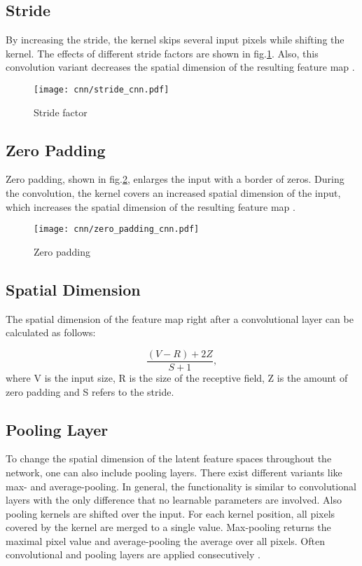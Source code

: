 \subsection{Stride}
By increasing the stride, the kernel skips several input pixels while shifting the kernel. The effects of different stride factors are shown in fig.\ref{fig:stride_cnn}. Also, this convolution variant decreases the spatial dimension of the resulting feature map \cite{OShea2015}.

\begin{figure}[H]
  \centering
  \texttt{[image: cnn/stride\_cnn.pdf]}
  \caption {Stride factor}
  \label{fig:stride_cnn}
\end{figure}


\subsection{Zero Padding}
Zero padding, shown in fig.\ref{fig:zero_padding_cnn}, enlarges the input with a border of zeros. During the convolution, the kernel covers an increased spatial dimension of the input, which increases the spatial dimension of the resulting feature map \cite{OShea2015}.

\begin{figure}[H]
  \centering
  \texttt{[image: cnn/zero\_padding\_cnn.pdf]}
  \caption {Zero padding}
  \label{fig:zero_padding_cnn}
\end{figure}



\subsection{Spatial Dimension}

 The spatial dimension of the feature map right after a convolutional layer can be calculated as follows:

\begin{equation}
  \frac{(V-R)+2Z}{S+1}, 
  \label{eq:spatial_dimensionality_cnn_feature map}
\end{equation}
where V is the input size, R is the size of the receptive field, Z is the amount of zero padding and S refers to the stride.

\subsection{Pooling Layer}
To change the spatial dimension of the latent feature spaces throughout the network, one can also include pooling layers. There exist different variants like max- and average-pooling. In general, the functionality is similar to convolutional layers with the only difference that no learnable parameters are involved. Also pooling kernels are shifted over the input. For each kernel position, all pixels covered by the kernel are merged to a single value. Max-pooling returns the maximal pixel value and average-pooling the average over all pixels. Often convolutional and pooling layers are applied consecutively \cite{OShea2015}.


